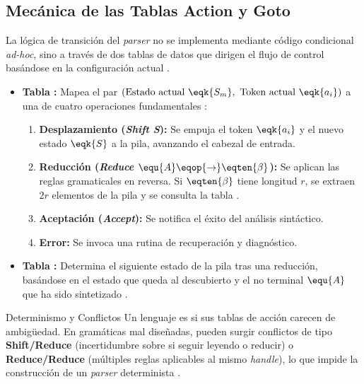 \subsection{Mecánica de las Tablas Action y Goto}
\label{subsec:3_6_4_tablas}

La lógica de transición del \textit{parser} no se implementa mediante código condicional \textit{ad-hoc}, sino a través de dos tablas de datos que dirigen el flujo de control basándose en la configuración actual \cite{aho2006compilers}.

\begin{itemize}
    \item \textbf{Tabla :} Mapea el par $(\text{Estado actual } \eqk{S_m}, \text{ Token actual } \eqk{a_i})$ a una de cuatro operaciones fundamentales \cite{aho2006compilers}:
    \begin{enumerate}
        \item \textbf{Desplazamiento (\textit{Shift S}):} Se empuja el token $\eqk{a_i}$ y el nuevo estado $\eqk{S}$ a la pila, avanzando el cabezal de entrada.
        \item \textbf{Reducción (\textit{Reduce } $\equ{A} \eqop{\rightarrow} \eqten{\beta}$):} Se aplican las reglas gramaticales en reversa. Si $\eqten{\beta}$ tiene longitud $r$, se extraen $2r$ elementos de la pila y se consulta la tabla .
        \item \textbf{Aceptación (\textit{Accept}):} Se notifica el éxito del análisis sintáctico.
        \item \textbf{Error:} Se invoca una rutina de recuperación y diagnóstico.
    \end{enumerate}
    \item \textbf{Tabla :} Determina el siguiente estado de la pila tras una reducción, basándose en el estado que queda al descubierto y el no terminal $\equ{A}$ que ha sido sintetizado \cite{aho2006compilers}.
\end{itemize}

\begin{observacion}{Determinismo y Conflictos}
Un lenguaje es  si sus tablas de acción carecen de ambigüedad. En gramáticas mal diseñadas, pueden surgir conflictos de tipo \textbf{Shift/Reduce} (incertidumbre sobre si seguir leyendo o reducir) o \textbf{Reduce/Reduce} (múltiples reglas aplicables al mismo \textit{handle}), lo que impide la construcción de un \textit{parser} determinista \cite{aho2006compilers}.
\end{observacion}

